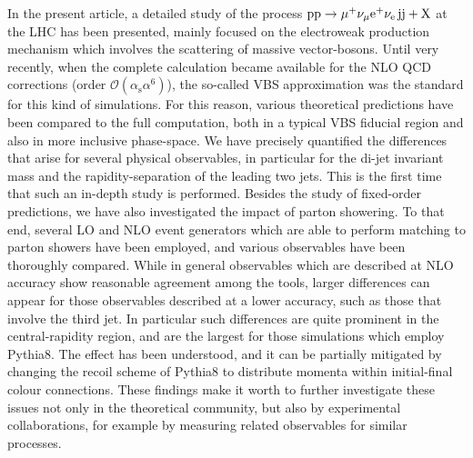 \documentclass[twocolumn,epjc3]{svjour3} %
\newcommand{\Pj}{\ensuremath{\text{j}}\xspace}
\newcommand{\Pp}{\ensuremath{\text{p}}\xspace}
\newcommand{\alphas}{\ensuremath{\alpha_\text{s}}\xspace}
\begin{document}
In the present article, a detailed study of the process $\Pp\Pp\to\mu^+\nu_\mu{\rm e}^+\nu_{\rm e}\,\Pj\Pj+\mathrm{X}$ at the LHC has been presented, 
mainly focused on the electroweak production mechanism which involves the scattering of massive vector-bosons.
Until very recently, when the complete calculation became available for the NLO QCD corrections (order $\mathcal O (\alphas\alpha^6)$),
the so-called VBS approximation was the standard for this kind of simulations. For this reason, various theoretical predictions 
have been compared to the full computation, both in a typical VBS fiducial region and also in more inclusive phase-space.
We have precisely quantified the differences that arise for several physical observables, 
in particular for the di-jet invariant mass and the rapidity-separation of the leading two jets.
This is the first time that such an in-depth study is performed.
Besides the study of fixed-order predictions, we have also investigated the impact of parton showering.
To that end, several LO and NLO event generators 
which are able to perform matching to parton showers have been employed, and various observables have been thoroughly compared.
While in general observables which are described at NLO accuracy show reasonable agreement among the tools, larger differences can 
appear for those observables described at a lower accuracy, such as those that involve the third jet.
In particular such differences are quite prominent in the central-rapidity region, and are the largest for those simulations which employ {\sc Pythia8}.
The effect
has been understood, and it can be partially mitigated by changing the recoil scheme of {\sc Pythia8} to distribute momenta within initial-final colour connections. These findings make it worth 
to further investigate these issues not only in the theoretical community, but also by experimental collaborations, for example by 
measuring related observables for similar processes.
\end{document}
